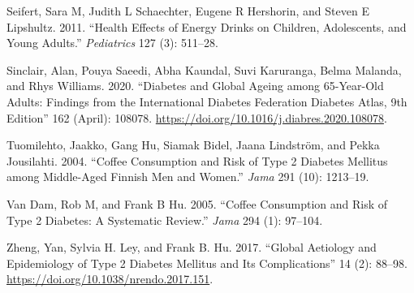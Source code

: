 \documentclass{scrartcl}
\begin{document}
\begin{hangparas}{1.5em}{1}
\hypertarget{citeproc_bib_item_7}{Seifert, Sara M, Judith L Schaechter, Eugene R Hershorin, and Steven E Lipshultz. 2011. “Health Effects of Energy Drinks on Children, Adolescents, and Young Adults.” \textit{Pediatrics} 127 (3): 511–28.}

\hypertarget{citeproc_bib_item_8}{Sinclair, Alan, Pouya Saeedi, Abha Kaundal, Suvi Karuranga, Belma Malanda, and Rhys Williams. 2020. “Diabetes and Global Ageing among 65-Year-Old Adults: Findings from the International Diabetes Federation Diabetes Atlas, 9th Edition” 162 (April): 108078. \href{https://doi.org/10.1016/j.diabres.2020.108078}{https://doi.org/10.1016/j.diabres.2020.108078}.}

\hypertarget{citeproc_bib_item_9}{Tuomilehto, Jaakko, Gang Hu, Siamak Bidel, Jaana Lindström, and Pekka Jousilahti. 2004. “Coffee Consumption and Risk of Type 2 Diabetes Mellitus among Middle-Aged Finnish Men and Women.” \textit{Jama} 291 (10): 1213–19.}

\hypertarget{citeproc_bib_item_10}{Van Dam, Rob M, and Frank B Hu. 2005. “Coffee Consumption and Risk of Type 2 Diabetes: A Systematic Review.” \textit{Jama} 294 (1): 97–104.}

\hypertarget{citeproc_bib_item_11}{Zheng, Yan, Sylvia H. Ley, and Frank B. Hu. 2017. “Global Aetiology and Epidemiology of Type 2 Diabetes Mellitus and Its Complications” 14 (2): 88–98. \href{https://doi.org/10.1038/nrendo.2017.151}{https://doi.org/10.1038/nrendo.2017.151}.}
\end{hangparas}
\end{document}
